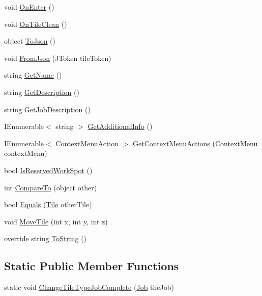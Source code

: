 \begin{DoxyCompactItemize}
\item 
void \hyperlink{class_tile_ad0acba5981f6e117788c1c112ac1e443}{On\+Enter} ()
\item 
void \hyperlink{class_tile_a1a39799ae879d44cd5c88ba1349e656e}{On\+Tile\+Clean} ()
\item 
object \hyperlink{class_tile_a852cc14213c5a329e0d70eedd22f023a}{To\+Json} ()
\item 
void \hyperlink{class_tile_a2c8ea5b7ad194989644872ffbf29c491}{From\+Json} (J\+Token tile\+Token)
\item 
string \hyperlink{class_tile_a6a552b263f6505a56a4d81f9ed835e84}{Get\+Name} ()
\item 
string \hyperlink{class_tile_a827ddb92a97dc4f34ab12052127f4d3b}{Get\+Description} ()
\item 
string \hyperlink{class_tile_a6f3f4232bc888cd335b3d0b2af6edda5}{Get\+Job\+Description} ()
\item 
I\+Enumerable$<$ string $>$ \hyperlink{class_tile_adae7d6b9e3e0e33ed9a398efca024055}{Get\+Additional\+Info} ()
\item 
I\+Enumerable$<$ \hyperlink{class_context_menu_action}{Context\+Menu\+Action} $>$ \hyperlink{class_tile_abb0b61dee4ac0ed5af02165c45a6e688}{Get\+Context\+Menu\+Actions} (\hyperlink{class_context_menu}{Context\+Menu} context\+Menu)
\item 
bool \hyperlink{class_tile_adee7f47667dd691bc8a6ba2c382c2751}{Is\+Reserved\+Work\+Spot} ()
\item 
int \hyperlink{class_tile_a6151ab911bebe9e8c930427799697165}{Compare\+To} (object other)
\item 
bool \hyperlink{class_tile_a96cd7d02df2c613bc99961e1456f4c53}{Equals} (\hyperlink{class_tile}{Tile} other\+Tile)
\item 
void \hyperlink{class_tile_afe3b386af919d58d0c8f69ae50e2d96e}{Move\+Tile} (int x, int y, int z)
\item 
override string \hyperlink{class_tile_a0aa5ac04f01031e9cdfd9ae9abcb75bd}{To\+String} ()
\end{DoxyCompactItemize}
\subsection*{Static Public Member Functions}
\begin{DoxyCompactItemize}
\item 
static void \hyperlink{class_tile_a6e49ff8d44f3f2d0ae06370db9c7db21}{Change\+Tile\+Type\+Job\+Complete} (\hyperlink{class_job}{Job} the\+Job)
\end{DoxyCompactItemize}
